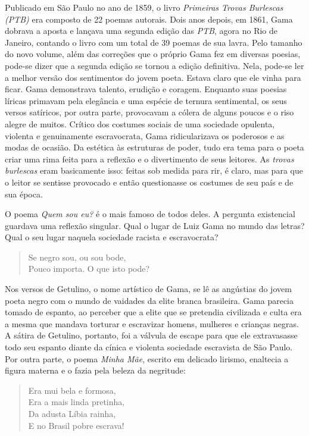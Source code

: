 Publicado em São Paulo no ano de 1859, o livro \emph{Primeiras Trovas
Burlescas (PTB)} era composto de 22 poemas autorais. Dois anos depois,
em 1861, Gama dobrava a aposta e lançava uma segunda edição das
\emph{PTB}, agora no Rio de Janeiro, contando o livro com um total de 39
poemas de sua lavra. Pelo tamanho do novo volume, além das correções que
o próprio Gama fez em diversas poesias, pode-se dizer que a segunda
edição se tornou a edição definitiva. Nela, pode-se ler a melhor versão
dos sentimentos do jovem poeta. Estava claro que ele vinha para ficar.
Gama demonstrava talento, erudição e coragem. Enquanto suas poesias
líricas primavam pela elegância e uma espécie de ternura sentimental, os
seus versos satíricos, por outra parte, provocavam a cólera de alguns
poucos e o riso alegre de muitos. Crítico dos costumes sociais de uma
sociedade opulenta, violenta e genuinamente escravocrata, Gama
ridicularizava os poderosos e as modas de ocasião. Da estética às
estruturas de poder, tudo era tema para o poeta criar uma rima feita
para a reflexão e o divertimento de seus leitores. As \emph{trovas
burlescas} eram basicamente isso: feitas sob medida para rir, é claro,
mas para que o leitor se sentisse provocado e então questionasse os
costumes de seu país e de sua época.

O poema \emph{Quem sou eu?} é o mais famoso de todos deles. A pergunta
existencial guardava uma reflexão singular. Qual o lugar de Luiz Gama no
mundo das letras? Qual o seu lugar naquela sociedade racista e
escravocrata?

\begin{verse}
Se negro sou, ou sou bode,\\
Pouco importa. O que isto pode?
\end{verse}

Nos versos de Getulino, o nome artístico de Gama, se lê as angústias do
jovem poeta negro com o mundo de vaidades da elite branca brasileira. 
Gama parecia tomado de espanto, ao perceber que a elite que se pretendia civilizada e culta
era a mesma que mandava torturar e escravizar homens, mulheres
e crianças negras. A sátira de Getulino, portanto, foi a válvula de
escape para que ele extravasasse todo seu espanto diante da cínica e
violenta sociedade escravista de São Paulo. Por outra parte, o poema
\emph{Minha Mãe}, escrito em delicado lirismo, enaltecia a figura
materna e o fazia pela beleza da negritude:

\begin{verse}
Era mui bela e formosa,\\
Era a mais linda pretinha,\\
Da adusta Líbia rainha,\\
E no Brasil pobre escrava!
\end{verse}

